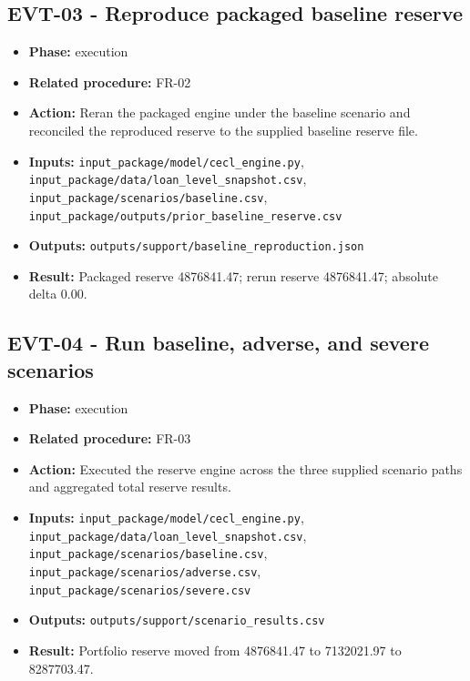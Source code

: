 \documentclass[11pt]{article}
\begin{document}
\subsection*{EVT-03 - Reproduce packaged baseline reserve}
\begin{itemize}
\item \textbf{Phase:} execution
\item \textbf{Related procedure:} FR-02
\item \textbf{Action:} Reran the packaged engine under the baseline scenario and reconciled the reproduced reserve to the supplied baseline reserve file.
\item \textbf{Inputs:} \texttt{input\_package/model/cecl\_engine.py}, \texttt{input\_package/data/loan\_level\_snapshot.csv}, \texttt{input\_package/scenarios/baseline.csv}, \texttt{input\_package/outputs/prior\_baseline\_reserve.csv}
\item \textbf{Outputs:} \texttt{outputs/support/baseline\_reproduction.json}
\item \textbf{Result:} Packaged reserve 4876841.47; rerun reserve 4876841.47; absolute delta 0.00.
\end{itemize}
\subsection*{EVT-04 - Run baseline, adverse, and severe scenarios}
\begin{itemize}
\item \textbf{Phase:} execution
\item \textbf{Related procedure:} FR-03
\item \textbf{Action:} Executed the reserve engine across the three supplied scenario paths and aggregated total reserve results.
\item \textbf{Inputs:} \texttt{input\_package/model/cecl\_engine.py}, \texttt{input\_package/data/loan\_level\_snapshot.csv}, \texttt{input\_package/scenarios/baseline.csv}, \texttt{input\_package/scenarios/adverse.csv}, \texttt{input\_package/scenarios/severe.csv}
\item \textbf{Outputs:} \texttt{outputs/support/scenario\_results.csv}
\item \textbf{Result:} Portfolio reserve moved from 4876841.47 to 7132021.97 to 8287703.47.
\end{itemize}
\end{document}

